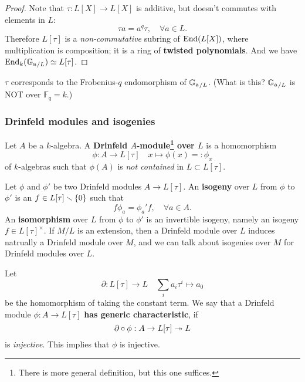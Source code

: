 \documentclass{article}
\newcommand{\F}{\mathbb{F}}
\begin{document}
\begin{proof}
    Note that $\tau : L[X]\to L[X]$ is additive,
    but doesn't commutes with elements in $L$: \[\tau a = a^q\tau,\quad\forall a\in L.\]
    Therefore $L[\tau]$ is a \textit{non-commutative} subring of $\operatorname{End}(L[X])$, where multiplication is composition;
    it is a ring of \textbf{twisted polynomials}. And we have $\operatorname{End}_{k}({\mathbb{G}_{\mathrm{a}}}_{/L})\simeq L[\tau]$.
\end{proof}
\begin{remark}
    $\tau$ corresponds to the Frobenius-$q$ endomorphism of ${\mathbb{G}_{\mathrm{a}}}_{/L}$. (What is this? ${\mathbb{G}_{\mathrm{a}}}_{/L}$ is NOT over $\F_q = k$.)
\end{remark}

\subsubsection{Drinfeld modules and isogenies}
Let $A$ be a $k$-algebra.
A \textbf{Drinfeld $A$-module\footnote{
    There is more general definition, but this one suffices.
} over $L$} is a homomorphism
\[\phi : A\to L[\tau]\quad x\mapsto \phi(x) =: \phi_x\]
of $k$-algebras such that $\phi(A)$ is \textit{not contained} in $L\subset L[\tau]$.

Let $\phi$ and $\phi'$ be two Drinfeld modules $A\to L[\tau]$.
An \textbf{isogeny} over $L$ from $\phi$ to $\phi'$
is an $f\in L[\tau]\smallsetminus\{0\}$ such that \[f\phi_a = \phi_a'f,\quad\forall a\in A.\]
An \textbf{isomorphism} over $L$ from $\phi$ to $\phi'$ is an invertible isogeny, namely an isogeny $f\in L[\tau]^\times$.
If $M/L$ is an extension,
then a Drinfeld module over $L$ induces natrually a Drinfeld module over $M$,
and we can talk about isogenies over $M$ for Drinfeld modules over $L$.



\begin{remark}[Another interpretation]

\end{remark}

Let \[\partial : L[\tau]\to L\quad \sum_i a_i\tau^i\mapsto a_0\]
be the homomorphism of taking the constant term.
We say that a Drinfeld module $\phi : A\to L[\tau]$ \textbf{has generic characteristic},
if \[\partial\circ \phi : A\to L[\tau]\twoheadrightarrow L\]
is \textit{injective}. This implies that $\phi$ is injective.
\end{document}
